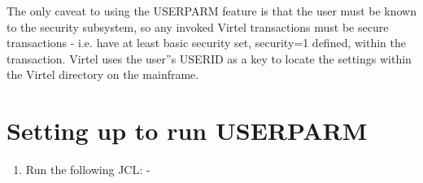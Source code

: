 \documentclass[letterpaper,10pt,english]{sphinxmanual}
\begin{document}
The only caveat to using the USERPARM feature is that the user must be known to the security subsystem, so any invoked Virtel transactions must be secure transactions - i.e. have at least basic security set, security=1 defined, within the transaction. Virtel uses the user”s USERID as a key to locate the settings within the Virtel directory on the mainframe.


\section{Setting up to run USERPARM}
\label{\detokenize{TN202002:setting-up-to-run-userparm}}\begin{enumerate}
\def\theenumi{\arabic{enumi}}
\def\labelenumi{\theenumi .}
\makeatletter\def\p@enumii{\p@enumi \theenumi .}\makeatother
\item {} 
Run the following JCL: -

\end{enumerate}
\end{document}
